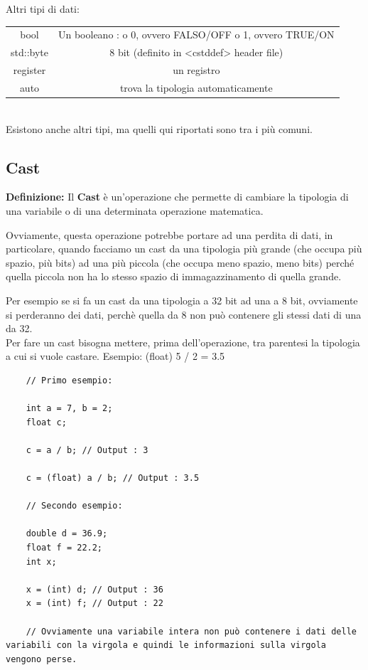 \break

\textsf{\small Altri tipi di dati: } \\

\begin{tabular}{cc} %
	\color{myblue2}bool & Un booleano : o 0, ovvero FALSO/OFF o 1, ovvero TRUE/ON \\
	\color{myblue2}std::byte & 8 bit (definito in <cstddef> header file) \\
	\color{myblue2}register &  un registro\\ 
	\color{myblue2} auto &  trova la tipologia automaticamente\\
\end{tabular}\\

\textsf{\small Esistono anche altri tipi, ma quelli qui riportati sono tra i più comuni.}\\

\subsection{Cast}

\textsf{\small \textbf{Definizione: } Il \textbf{Cast} è un'operazione che permette di cambiare la tipologia di una variabile o di una determinata operazione matematica.} 

\textsf{\small Ovviamente, questa operazione potrebbe portare ad una perdita di dati, in particolare, quando facciamo un cast da una tipologia più grande (che occupa più spazio, più bits) ad una più piccola (che occupa meno spazio, meno bits) perché quella piccola non ha lo stesso spazio di immagazzinamento di quella grande.} 

\textsf{\small Per esempio se si fa un cast da una tipologia a 32 bit ad una a 8 bit, ovviamente si perderanno dei dati, perchè quella da 8 non può contenere gli stessi dati di una da 32.} \\

\textsf{\small Per fare un cast bisogna mettere, prima dell'operazione, tra parentesi la tipologia a cui si vuole castare. Esempio: (float) 5 / 2 = 3.5} \\

\begin{lstlisting}
	// Primo esempio:
	
	int a = 7, b = 2;
	float c;
	
	c = a / b; // Output : 3
	
	c = (float) a / b; // Output : 3.5
	
	// Secondo esempio:
	
	double d = 36.9;
	float f = 22.2;
	int x;
	
	x = (int) d; // Output : 36
	x = (int) f; // Output : 22
	
	// Ovviamente una variabile intera non può contenere i dati delle variabili con la virgola e quindi le informazioni sulla virgola vengono perse.
\end{lstlisting}

